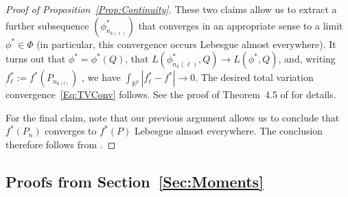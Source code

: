 \documentclass[a4paper,12pt]{article}
\begin{document}
\begin{proof}[Proof of Proposition~\ref{Prop:Continuity}]
These two claims allow us to extract a further subsequence $(\phi_{n_{k(\ell)}}^*)$ that converges in an appropriate sense to a limit $\phi^* \in \Phi$ (in particular, this convergence occurs Lebesgue almost everywhere).  It turns out that $\phi^* = \phi^*(Q)$, that $L(\phi_{n_k(\ell)}^*,Q) \rightarrow L(\phi^*,Q)$, and, writing $f_\ell^* := f^*(P_{n_{k(l)}})$ , we have $\int_{\mathbb{R}^p} |f_\ell^* - f^*| \rightarrow 0$.  The desired total variation convergence~\eqref{Eq:TVConv} follows.  See the proof of Theorem~4.5 of \citet{dumbgen2011approximation} for details.

For the final claim, note that our previous argument allows us to conclude that $f^*(P_n)$ converges to $f^*(P)$ Lebesgue almost everywhere.  The conclusion therefore follows from \citet[][Theorem~10.8]{rockafellar1997convex}.
\end{proof}

\subsection{Proofs from Section~\ref{Sec:Moments}}
\end{document}
